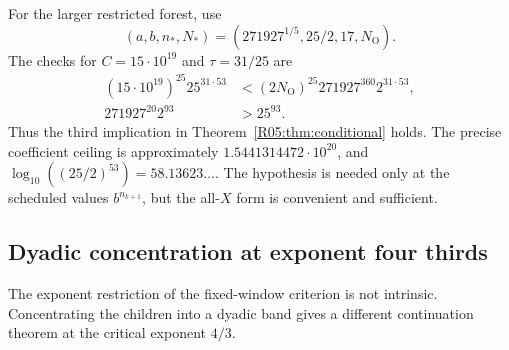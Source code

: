 \documentclass[11pt,a4paper]{article}
\theoremstyle{definition}\newtheorem{definition}[theorem]{Definition}
\theoremstyle{remark}\newtheorem{remark}[theorem]{Remark}
\newcommand{\No}{N_{\mathrm O}}\newcommand{\Nu}{N_{\mathrm U}}
\begin{document}
For the larger restricted forest, use
\[
 (a,b,n_*,N_*)=(271927^{1/5},25/2,17,\No).
\]
The checks for $C=15\cdot10^{19}$ and $\tau=31/25$ are
\begin{equation}\label{R05:eq:optimizedchecks}
 \begin{aligned}
 (15\cdot10^{19})^{25}25^{31\cdot53}
   &<(2\No)^{25}271927^{360}2^{31\cdot53},\\
 271927^{20}2^{93}&>25^{93}.
 \end{aligned}
\end{equation}
Thus the third implication in Theorem~\ref{R05:thm:conditional} holds.
The precise coefficient ceiling is approximately
$1.5441314472\cdot10^{20}$, and
$\log_{10}((25/2)^{53})=58.13623\ldots$.
The hypothesis is needed only at the scheduled values
$b^{n_{k+1}}$, but the all-$X$ form is convenient and sufficient.

\subsection{Dyadic concentration at exponent four thirds}
\label{R05:sec:dyadic}

The exponent restriction of the fixed-window criterion is not
intrinsic. Concentrating the children into a dyadic band gives a
different continuation theorem at the critical exponent $4/3$.
\end{document}
